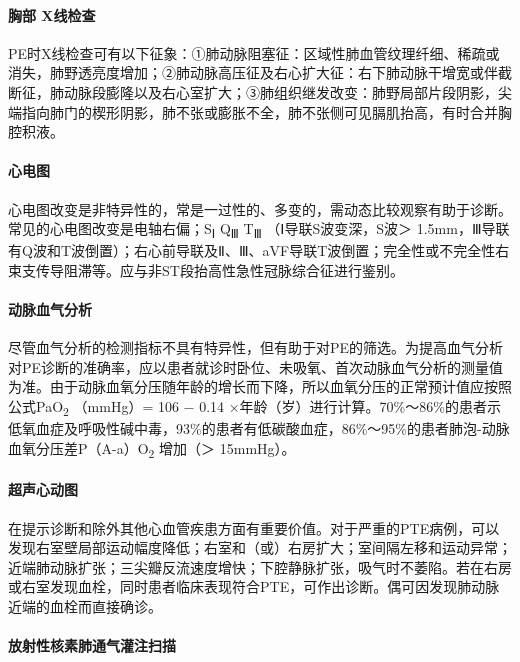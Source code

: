 \paragraph{胸部 X线检查}

PE时X线检查可有以下征象：①肺动脉阻塞征：区域性肺血管纹理纤细、稀疏或消失，肺野透亮度增加；②肺动脉高压征及右心扩大征：右下肺动脉干增宽或伴截断征，肺动脉段膨隆以及右心室扩大；③肺组织继发改变：肺野局部片段阴影，尖端指向肺门的楔形阴影，肺不张或膨胀不全，肺不张侧可见膈肌抬高，有时合并胸腔积液。

\paragraph{心电图}

心电图改变是非特异性的，常是一过性的、多变的，需动态比较观察有助于诊断。常见的心电图改变是电轴右偏；S\textsubscript{Ⅰ}
Q\textsubscript{Ⅲ} T\textsubscript{Ⅲ} （Ⅰ导联S波变深，S波＞
1.5mm，Ⅲ导联有Q波和T波倒置）；右心前导联及Ⅱ、Ⅲ、aVF导联T波倒置；完全性或不完全性右束支传导阻滞等。应与非ST段抬高性急性冠脉综合征进行鉴别。

\paragraph{动脉血气分析}

尽管血气分析的检测指标不具有特异性，但有助于对PE的筛选。为提高血气分析对PE诊断的准确率，应以患者就诊时卧位、未吸氧、首次动脉血气分析的测量值为准。由于动脉血氧分压随年龄的增长而下降，所以血氧分压的正常预计值应按照公式PaO\textsubscript{2}
（mmHg）= 106 − 0.14
×年龄（岁）进行计算。70\%～86\%的患者示低氧血症及呼吸性碱中毒，93\%的患者有低碳酸血症，86\%～95\%的患者肺泡-动脉血氧分压差P（A-a）O\textsubscript{2}
增加（＞ 15mmHg）。

\paragraph{超声心动图}

在提示诊断和除外其他心血管疾患方面有重要价值。对于严重的PTE病例，可以发现右室壁局部运动幅度降低；右室和（或）右房扩大；室间隔左移和运动异常；近端肺动脉扩张；三尖瓣反流速度增快；下腔静脉扩张，吸气时不萎陷。若在右房或右室发现血栓，同时患者临床表现符合PTE，可作出诊断。偶可因发现肺动脉近端的血栓而直接确诊。

\paragraph{放射性核素肺通气灌注扫描}

